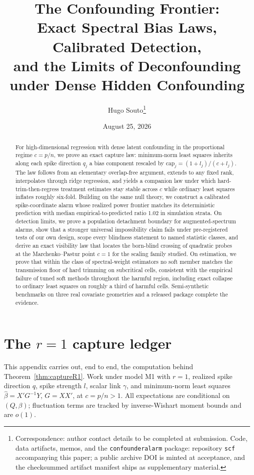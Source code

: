 \documentclass[11pt]{article}
\title{The Confounding Frontier:\\ Exact Spectral Bias Laws, Calibrated Detection,\\ and the Limits of Deconfounding under Dense Hidden Confounding}
\author{Hugo Souto\thanks{Correspondence: author contact details to be completed at submission. Code, data artifacts, memos, and the \texttt{confounderalarm} package: repository \texttt{scf} accompanying this paper; a public archive DOI is minted at acceptance, and the checksummed artifact manifest ships as supplementary material. }}
\date{August 25, 2026}
\theoremstyle{definition}
\theoremstyle{remark}
\begin{document}
\maketitle

\begin{abstract}
For high-dimensional regression with dense latent confounding in the proportional regime $c=p/n$, we prove an exact capture law: minimum-norm least squares inherits along each spike direction $q_j$ a bias component rescaled by $\mathrm{cap}_j=(1+l_j)/(c+l_j)$. The law follows from an elementary overlap-free argument, extends to any fixed rank, interpolates through ridge regression, and yields a companion law under which hard-trim-then-regress treatment estimates stay stable across $c$ while ordinary least squares inflates roughly six-fold. Building on the same null theory, we construct a calibrated spike-coordinate alarm whose realized power frontier matches its deterministic prediction with median empirical-to-predicted ratio 1.02 in simulation strata. On detection limits, we prove a population detachment boundary for augmented-spectrum alarms, show that a stronger universal impossibility claim fails under pre-registered tests of our own design, scope every blindness statement to named statistic classes, and derive an exact visibility law that locates the born-blind crossing of quadratic probes at the Marchenko--Pastur point $c=1$ for the scaling family studied. On estimation, we prove that within the class of spectral-weight estimators no soft member matches the transmission floor of hard trimming on subcritical cells, consistent with the empirical failure of tuned soft methods throughout the harmful region, including exact collapse to ordinary least squares on roughly a third of harmful cells. Semi-synthetic benchmarks on three real covariate geometries and a released package complete the evidence.
\end{abstract}










\appendix

\section{The $r=1$ capture ledger}\label{app:ledger}

This appendix carries out, end to end, the computation behind Theorem~\ref{thm:captureR1}. Work under model M1 with $r=1$, realized spike direction $q$, spike strength $l$, scalar link $\gamma$, and minimum-norm least squares $\hat\beta=X'G^{-1}Y$, $G=XX'$, at $c=p/n>1$. All expectations are conditional on $(Q,\beta)$; fluctuation terms are tracked by inverse-Wishart moment bounds and are $o(1)$.
\end{document}
